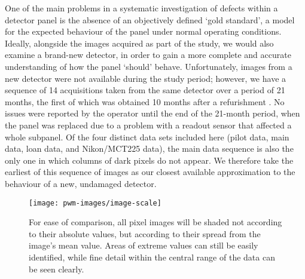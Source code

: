 \documentclass[\main/IO-Pixels.tex]{subfiles}
\begin{document}
One of the main problems in a systematic investigation of defects within a detector panel is the absence of an objectively defined `gold standard', a model for the expected behaviour of the panel under normal operating conditions. Ideally, alongside the images acquired as part of the study, we would also examine a brand-new detector, in order to gain a more complete and accurate understanding of how the panel `should' behave. Unfortunately, images from a new detector were not available during the study period; however, we have a sequence of 14 acquisitions taken from the same detector over a period of 21 months, the first of which was obtained 10 months after a refurishment . No issues were reported by the operator until the end of the 21-month period, when the panel was replaced due to a problem with a readout sensor that affected a whole subpanel. Of the four distinct data sets included here (pilot data, main data, loan data, and Nikon/MCT225 data), the main data sequence is also the only one in which columns of dark pixels do not appear. We therefore take the earliest of this sequence of images as our closest available approximation to the behaviour of a new, undamaged detector.


\begin{figure}
\caption{For ease of comparison, all pixel images will be shaded not according to their absolute values, but according to their spread from the image's mean value. Areas of extreme values can still be easily identified, while fine detail within the central range of the data can be seen clearly.}

    \texttt{[image: pwm-images/image-scale]}

\end{figure}


\end{document}
